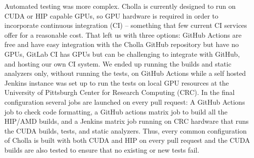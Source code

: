Automated testing was more complex. Cholla is currently designed to run on CUDA or HIP capable GPUs, so GPU hardware is required in order to incorporate continuous integration (CI)  -- something that few current CI services offer for a reasonable cost. That left us with three options: GitHub Actions are free and have easy integration with the Cholla GitHub repository but have no GPUs, GitLab CI has GPUs but can be challenging to integrate with GitHub, and hosting our own CI system. We ended up running the builds and static analyzers only, without running the tests, on GitHub Actions while a self hosted Jenkins instance was set up to run the tests on local GPU resources at the University of Pittsburgh Center for Research Computing (CRC). In the final configuration several jobs are launched on every pull request: A GitHub Actions job to check code formatting, a GitHub actions matrix job to build all the HIP/AMD builds, and a Jenkins matrix job running on CRC hardware that runs the CUDA builds, tests, and static analyzers. Thus, every common configuration of Cholla is built with both CUDA and HIP on every pull request and the CUDA builds are also tested to ensure that no existing or new tests fail. 



